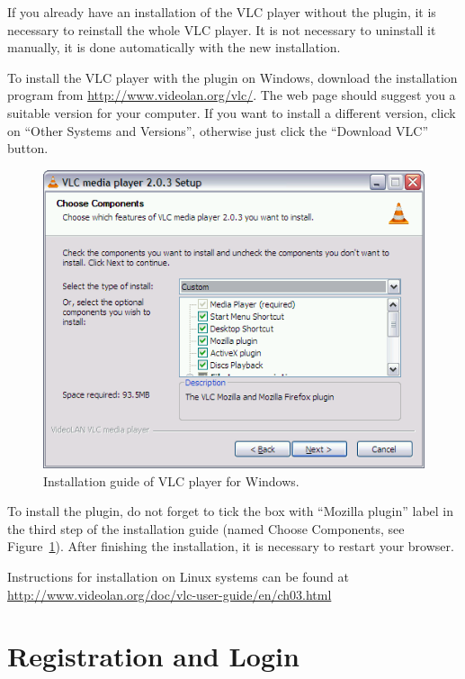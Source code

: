 If you already have an installation of the VLC player without the plugin, it is necessary to reinstall the whole VLC player. It is not necessary to uninstall it manually, it is done automatically with the new installation.

To install the VLC player with the plugin on Windows, download the installation program from \url{http://www.videolan.org/vlc/}. The web page should suggest you a suitable version for your computer. If you want to install a different version, click on ``Other Systems and Versions'', otherwise just click the ``Download VLC'' button.

\begin{figure}[h]
\begin{center}
\includegraphics[scale=0.4]{figures/user_manual/vlc_installation.png}
\end{center}
\caption{Installation guide of VLC player for Windows.}
\label{fig:vlc}
\end{figure}

To install the plugin, do not forget to tick the box with ``Mozilla plugin'' label in the third step of the installation guide (named Choose Components, see Figure~\ref{fig:vlc}). After finishing the installation, it is necessary to restart your browser.

Instructions for installation on Linux systems can be found at \url{http://www.videolan.org/doc/vlc-user-guide/en/ch03.html}


\section{Registration and Login}
\label{um:sec:login}

